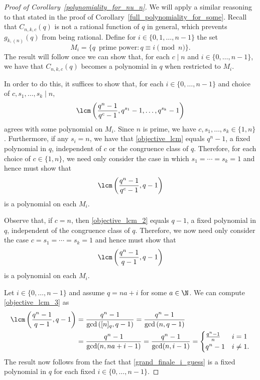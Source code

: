 \begin{proof}[Proof of Corollary~\ref{polynomiality_for_nu_n}]
We will apply a similar reasoning to that stated in the proof of Corollary~\ref{full_polynomiality_for_some}.
Recall that \(C_{n,k,c}(q)\) is not a rational function of \(q\) in general,
which prevents \(g_{k,(n)} (q)\) from being rational.
Define for \(i \in \{0,1,\ldots,n-1\}\) the set
\begin{equation}
M_i = \{ q \, \text{ prime power} : q \equiv i \pmod{n}\}.
\end{equation}
The result will follow once we can show that, for each \(c \mid n\) and \(i \in \{0,\ldots,n-1\}\), we have that \(C_{n,k,c}(q)\) becomes a polynomial in \(q\) when restricted to \(M_i\).

In order to do this, it suffices to show that, for each \(i \in \{0,\ldots,n-1\}\) and choice of \(c, s_1,\ldots,s_k \mid n\),
\begin{equation}
\label{objective_lcm}
\lcm
\left (
\frac{q^n-1}{q^c-1},
q^{s_1} - 1,
\ldots,
q^{s_k} - 1
\right )
\end{equation}
agrees with some polynomial on \(M_i\).
Since \(n\) is prime, we have \(c,s_1,\ldots,s_k \in \{1,n\}\).
Furthermore, if any \(s_i = n\), we have that \eqref{objective_lcm} equals \(q^n-1\), a fixed polynomial in \(q\),
independent of \(c\) or the congruence class of \(q\).
Therefore, for each choice of \(c \in \{1,n\}\), we need only consider the case in which \(s_1 = \cdots = s_k = 1\) and hence must show that
\begin{equation}
\label{objective_lcm_2}
\lcm
\left (
\frac{q^n-1}{q^c-1},
q - 1
\right )
\end{equation}
is a polynomial on each \(M_i\).

Observe that, if \(c = n\), then \eqref{objective_lcm_2} equals \(q-1\), a fixed polynomial in \(q\), independent of the congruence class of \(q\).
Therefore, we now need only consider the case \(c = s_1 = \cdots = s_k = 1\) and hence must show that
\begin{equation}
\label{objective_lcm_3}
\lcm
\left (
\frac{q^n-1}{q-1},
q - 1
\right )
\end{equation}
is a polynomial on each \(M_i\).

Let \(i \in \{0,\ldots,n-1\}\)
and assume \(q = na + i\) for some \(a \in \N\).
We can compute \eqref{objective_lcm_3} as
\begin{align}
\lcm
\left (
\frac{q^n-1}{q-1},
q-1
\right )
& =
\frac{q^n-1}{
\gcd
\left (
[n]_q, q-1
\right )
}
=
\frac{q^n-1}{
\gcd \left (
n,q-1
\right )
} \nonumber \\
& =
\frac{q^n-1}{\gcd(n,na+i-1)}
= \frac{q^n-1}{\gcd(n,i-1)}
=
\begin{cases}
\frac{q^n-1}{n} & i=1 \\
q^n-1           & i \neq 1.
\end{cases}
\label{grand_finale_i_guess}
\end{align}
The result now follows from the fact that \eqref{grand_finale_i_guess} is a fixed polynomial in \(q\) for each fixed \(i \in \{0,\ldots,n-1\}\).
\end{proof}






